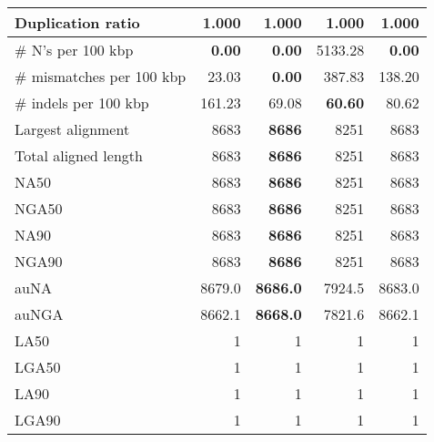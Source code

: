 \documentclass[12pt,a4paper]{article}
\begin{document}
\begin{table}[ht]
\begin{center}
\begin{tabular}{|l*{4}{|r}|}
Duplication ratio & 1.000 & 1.000 & 1.000 & 1.000 \\ \hline
\# N's per 100 kbp & {\bf 0.00} & {\bf 0.00} & 5133.28 & {\bf 0.00} \\ \hline
\# mismatches per 100 kbp & 23.03 & {\bf 0.00} & 387.83 & 138.20 \\ \hline
\# indels per 100 kbp & 161.23 & 69.08 & {\bf 60.60} & 80.62 \\ \hline
Largest alignment & 8683 & {\bf 8686} & 8251 & 8683 \\ \hline
Total aligned length & 8683 & {\bf 8686} & 8251 & 8683 \\ \hline
NA50 & 8683 & {\bf 8686} & 8251 & 8683 \\ \hline
NGA50 & 8683 & {\bf 8686} & 8251 & 8683 \\ \hline
NA90 & 8683 & {\bf 8686} & 8251 & 8683 \\ \hline
NGA90 & 8683 & {\bf 8686} & 8251 & 8683 \\ \hline
auNA & 8679.0 & {\bf 8686.0} & 7924.5 & 8683.0 \\ \hline
auNGA & 8662.1 & {\bf 8668.0} & 7821.6 & 8662.1 \\ \hline
LA50 & 1 & 1 & 1 & 1 \\ \hline
LGA50 & 1 & 1 & 1 & 1 \\ \hline
LA90 & 1 & 1 & 1 & 1 \\ \hline
LGA90 & 1 & 1 & 1 & 1 \\ \hline
\end{tabular}
\end{center}
\end{table}
\end{document}
